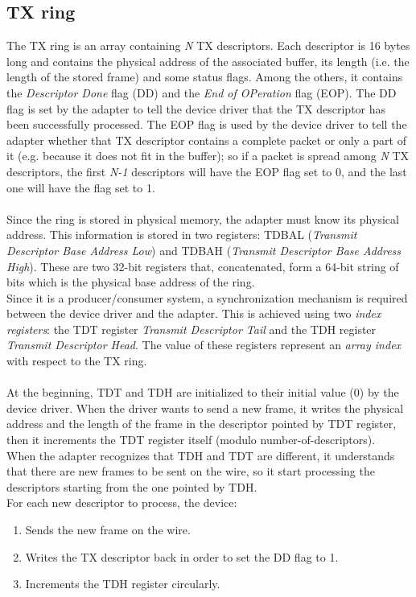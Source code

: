 \documentclass[a4paper, 12pt, titlepage]{report}
\begin{document}
\subsection{TX ring}
The TX ring is an array containing \textit{N} TX descriptors. Each descriptor is 16 bytes long and contains the physical address of the associated buffer, its length (i.e. the length of the stored frame) and some status flags. Among the others, it contains the \textit{Descriptor Done} flag (DD) and the \textit{End of OPeration} flag (EOP). The DD flag is set by the adapter to tell the device driver that the TX descriptor has been successfully processed. The EOP flag is used by the device driver to tell the adapter whether that TX descriptor contains a complete packet or only a part of it (e.g. because it does not fit in the buffer); so if a packet is spread among \textit{N} TX descriptors, the first \textit{N-1} descriptors will have the EOP flag set to 0, and the last one will have the flag set to 1.
\\
\\
Since the ring is stored in physical memory, the adapter must know its physical address. This information is stored in two registers: TDBAL (\textit{Transmit Descriptor Base Address Low}) and TDBAH (\textit{Transmit Descriptor Base Address High}). These are two 32-bit registers that, concatenated, form a 64-bit string of bits which is the physical base address of the ring.
\\
Since it is a producer/consumer system, a synchronization mechanism is required between the device driver and the adapter. This is achieved using two \textit{index registers}: the TDT register \textit{Transmit Descriptor Tail} and the TDH register \textit{Transmit Descriptor Head}. The value of these registers represent an \textit{array index} with respect to the TX ring.
\\
\\
At the beginning, TDT and TDH are initialized to their initial value (0) by the device driver. When the driver wants to send a new frame, it writes the physical address and the length of the frame in the descriptor pointed by TDT register, then it increments the TDT register itself (modulo number-of-descriptors).
\\
When the adapter recognizes that TDH and TDT are different, it understands that there are new frames to be sent on the wire, so it start processing the descriptors starting from the one pointed by TDH.
\\
For each new descriptor to process, the device:
\begin{enumerate}
\item Sends the new frame on the wire.
\item Writes the TX descriptor back in order to set the DD flag to 1.
\item Increments the TDH register circularly. 
\end{enumerate}
\end{document}
